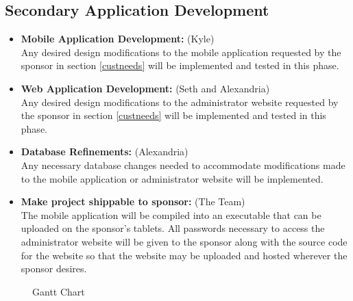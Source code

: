\documentclass[Letter,11pt]{article}
\begin{document}
	\subsection{Secondary Application Development}\label{dev2}
		
		\begin{itemize}
			\item\textbf{Mobile Application Development:} (Kyle)\\
			Any desired design modifications to the mobile application requested by the sponsor in section \ref{custneeds} will be implemented and tested in this phase. \\
			\item \textbf{Web Application Development:} (Seth and Alexandria)\\
			Any desired design modifications to the administrator website requested by the sponsor in section \ref{custneeds} will be implemented and tested in this phase. \\
			\item\textbf{Database Refinements:} (Alexandria)\\
			Any necessary database changes needed to accommodate modifications made to the mobile application or administrator website will be implemented. \\
			
			\item\textbf{Make project shippable to sponsor:} (The Team)\\
			The mobile application will be compiled into an executable that can be uploaded on the sponsor’s tablets. All passwords necessary to access the administrator website will be given to the sponsor along with the source code for the website so that the website may be uploaded and hosted wherever the sponsor desires. 
		\end{itemize}
		
		\begin{landscape}
			\begin{figure}
				
				\caption{\label{fig:gant}Gantt Chart}
			\end{figure}
		\end{landscape}

		
		
		
\end{document}
